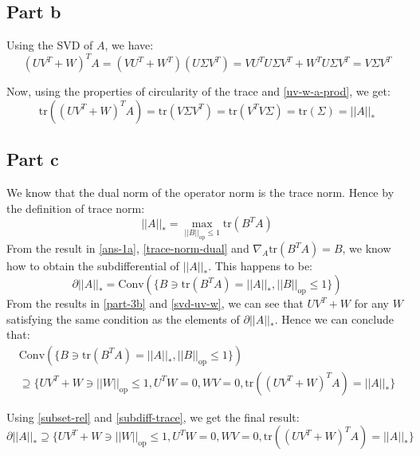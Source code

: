 \documentclass[11pt]{article}
\begin{document}
\subsection*{Part b}
\begin{flushleft}
Using the SVD of \(A\), we have:
\begin{equation}
\label{uv-w-a-prod}
(UV^{T} + W)^{T}A = (VU^{T} + W^{T})(U\Sigma V^{T}) = VU^{T}U\Sigma V^{T} + W^{T}U\Sigma V^{T} = V\Sigma V^{T}
\end{equation}

Now, using the properties of circularity of the trace and \ref{uv-w-a-prod}, we get:
\begin{equation}
\label{part-3b}
\text{tr}((UV^{T} + W)^{T}A) = \text{tr}(V\Sigma V^{T}) = \text{tr}(V^{T}V\Sigma) = \text{tr}(\Sigma) = ||A||_{*}
\end{equation}
\end{flushleft}

\subsection*{Part c}
\begin{flushleft}
We know that the dual norm of the operator norm is the trace norm. Hence by the definition of trace norm:
\begin{equation}
\label{trace-norm-dual}
\displaystyle ||A||_{*} = \max_{||B||_{\text{op}} \leq 1} \text{tr}(B^{T} A)
\end{equation}
From the result in \ref{ans-1a}, \ref{trace-norm-dual} and \(\nabla_{A} \text{tr}(B^{T}A) = B\), we know how to obtain the subdifferential of \(||A||_{*}\). This happens to be:
\begin{equation}
\label{subdiff-trace}
\displaystyle \partial ||A||_{*} = \text{Conv}\left(\{B \ni \text{tr}(B^{T}A) = ||A||_{*}, ||B||_{\text{op}} \leq 1\}\right)
\end{equation}
From the results in \ref{part-3b} and \ref{svd-uv-w}, we can see that \(UV^{T} + W\) for any \(W\) satisfying the same condition as the elements of \(\partial ||A||_{*}\). Hence we can conclude that:
\begin{multline}
\label{subset-rel}
\text{Conv}\left(\{B \ni \text{tr}(B^{T}A) = ||A||_{*}, ||B||_{\text{op}} \leq 1\}\right) \\ \supseteq \{UV^{T} + W \ni ||W||_{\text{op}} \leq 1, U^{T}W = 0, WV = 0, \text{tr}((UV^{T} + W)^{T}A) = ||A||_{*}\}
\end{multline}

Using \ref{subset-rel} and \ref{subdiff-trace}, we get the final result:
\begin{equation}
\label{ans-3c}
\displaystyle \partial ||A||_{*} \supseteq \{UV^{T} + W \ni ||W||_{\text{op}} \leq 1, U^{T}W = 0, WV = 0, \text{tr}((UV^{T} + W)^{T}A) = ||A||_{*} \}
\end{equation}

\end{flushleft}
\end{document}
